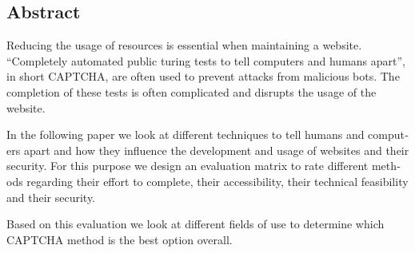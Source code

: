 

\begin{otherlanguage}{american}
	\chapter*{Abstract}
	Reducing the usage of resources is essential when maintaining a website. 
	“Completely automated public turing tests to tell computers and humans apart”, in short CAPTCHA, are often used to prevent attacks from malicious bots. 
	The completion of these tests is often complicated and disrupts the usage of the website. 

	In the following paper we look at different techniques to tell humans and computers apart and how they influence the development and usage of websites and their security. 
	For this purpose we design an evaluation matrix to rate different methods regarding their effort to complete, their accessibility, their technical feasibility and their security. 
	
	Based on this evaluation we look at different fields of use to determine which CAPTCHA method is the best option overall.

\end{otherlanguage}
